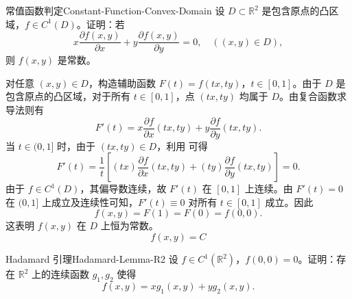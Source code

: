 \begin{problem}{常值函数判定}{Constant-Function-Convex-Domain}
    设 $D \subset \mathbb{R}^2$ 是包含原点的凸区域，$f \in C^1(D)$。证明：若
    \begin{equation}
        x \frac{\partial f(x,y)}{\partial x} + y \frac{\partial f(x,y)}{\partial y} = 0, \quad ((x,y) \in D), \label{eq:Euler-PDE}
    \end{equation}
    则 $f(x,y)$ 是常数。
\end{problem}

\begin{myproof}
    对任意 $(x, y) \in D$，构造辅助函数 $F(t) = f(tx, ty)$，$t \in [0, 1]$。由于 $D$ 是包含原点的凸区域，对于所有 $t \in [0, 1]$，点 $(tx, ty)$ 均属于 $D$。由复合函数求导法则有
    \begin{equation}
        F'(t) = x \frac{\partial f}{\partial x}(tx, ty) + y \frac{\partial f}{\partial y}(tx, ty).
    \end{equation}
    当 $t \in (0, 1]$ 时，由于 $(tx, ty) \in D$，利用  可得
    \begin{equation}
        F'(t) = \frac{1}{t} \left[ (tx) \frac{\partial f}{\partial x}(tx, ty) + (ty) \frac{\partial f}{\partial y}(tx, ty) \right] = 0.
    \end{equation}
    由于 $f \in C^1(D)$，其偏导数连续，故 $F'(t)$ 在 $[0, 1]$ 上连续。由 $F'(t) = 0$ 在 $(0, 1]$ 上成立及连续性可知，$F'(t) \equiv 0$ 对所有 $t \in [0, 1]$ 成立。因此
    \begin{equation}
        f(x, y) = F(1) = F(0) = f(0, 0).
    \end{equation}
    这表明 $f(x, y)$ 在 $D$ 上恒为常数。
    \begin{equation}
        \boxed{f(x, y) = C}
    \end{equation}
\end{myproof}


\begin{problem}{Hadamard 引理}{Hadamard-Lemma-R2}
    设 $f \in C^1(\mathbb{R}^2)$，$f(0,0) = 0$。证明：存在 $\mathbb{R}^2$ 上的连续函数 $g_1, g_2$ 使得
    \begin{equation}
        f(x,y) = x g_1(x,y) + y g_2(x,y).
    \end{equation}
\end{problem}

